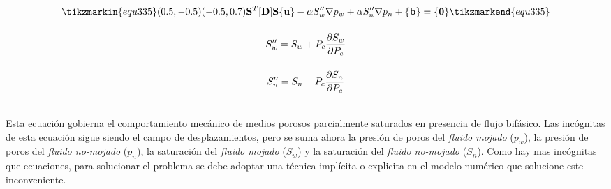 \begin{ceqn} 
\begin{subequations} \label{eq:equ334} 
\begin{gather}
\tikzmarkin{equ335}(0.5,-0.5)(-0.5,0.7)
\normalsize{\mathbf{S}^T[\mathbf{D}]\mathbf{S}\{\mathbf{u}\} - 
\alpha S''_w\nabla p_w + \alpha S''_n\nabla p_n + \{\mathbf{b}\} = \{\mathbf{0}\}}
\tikzmarkend{equ335}\label{eq:equ334a} \\[12pt]
S''_w = S_w + P_c\frac{\partial S_w}{\partial P_c}  \label{eq:equ334b} \\[12pt]
S''_n = S_n - P_c\frac{\partial S_n}{\partial P_c}  \label{eq:equ334c}
\end{gather}
\end{subequations} 
\end{ceqn}
\\
Esta ecuación gobierna el comportamiento mecánico de medios porosos parcialmente saturados en presencia de flujo bifásico. Las incógnitas de esta ecuación sigue siendo el campo de desplazamientos, pero se suma ahora la presión de poros del \textit{fluido mojado} ($p_w$), la presión de poros del \textit{fluido no-mojado} ($p_n$), la saturación del \textit{fluido mojado} ($S_w$) y la saturación del \textit{fluido no-mojado} ($S_n$). Como hay mas incógnitas que ecuaciones, para solucionar el problema se debe adoptar una técnica implícita o explicita en el modelo numérico que solucione este inconveniente.\bigskip






